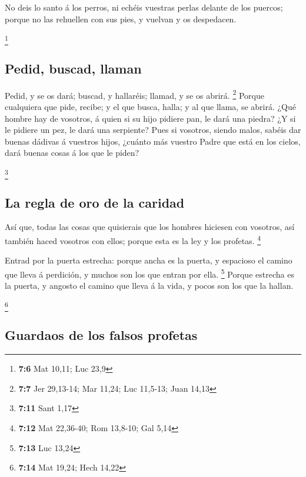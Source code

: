  No deis lo santo á los perros, ni echéis vuestras perlas
delante de los puercos; porque no las rehuellen con sus pies, y vuelvan
y os despedacen.

\footnote{\textbf{7:6} Mat 10,11; Luc 23,9}

\hypertarget{pedid-buscad-llaman}{%
\subsection{Pedid, buscad, llaman}\label{pedid-buscad-llaman}}

 Pedid, y se os dará; buscad, y hallaréis; llamad, y se os
abrirá. \footnote{\textbf{7:7} Jer 29,13-14; Mar 11,24; Luc 11,5-13;
  Juan 14,13}  Porque cualquiera que pide, recibe; y el
que busca, halla; y al que llama, se abrirá.  ¿Qué hombre
hay de vosotros, á quien si su hijo pidiere pan, le dará una piedra?
 ¿Y si le pidiere un pez, le dará una serpiente?
 Pues si vosotros, siendo malos, sabéis dar buenas
dádivas á vuestros hijos, ¿cuánto más vuestro Padre que está en los
cielos, dará buenas cosas á los que le piden?

\footnote{\textbf{7:11} Sant 1,17}

\hypertarget{la-regla-de-oro-de-la-caridad}{%
\subsection{La regla de oro de la
caridad}\label{la-regla-de-oro-de-la-caridad}}

 Así que, todas las cosas que quisierais que los hombres
hiciesen con vosotros, así también haced vosotros con ellos; porque esta
es la ley y los profetas. \footnote{\textbf{7:12} Mat 22,36-40; Rom
  13,8-10; Gal 5,14}

 Entrad por la puerta estrecha: porque ancha es la
puerta, y espacioso el camino que lleva á perdición, y muchos son los
que entran por ella. \footnote{\textbf{7:13} Luc 13,24} 
Porque estrecha es la puerta, y angosto el camino que lleva á la vida, y
pocos son los que la hallan.

\footnote{\textbf{7:14} Mat 19,24; Hech 14,22}

\hypertarget{guardaos-de-los-falsos-profetas}{%
\subsection{Guardaos de los falsos
profetas}\label{guardaos-de-los-falsos-profetas}}

